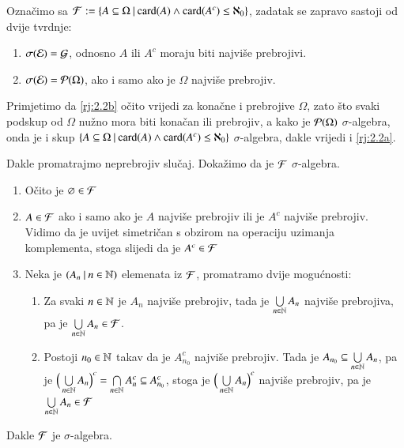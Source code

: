 \begin{rj}[\ref{zad:2.2}]
    Ozna\v cimo sa $\mathcal{F} := \{{A \subseteq \Omega} \: | \: {\textnormal{card}({A}) \land \textnormal{card}({A^c}) \leq \aleph_0}\}$,
    zadatak se zapravo sastoji od dvije tvrdnje:
    \begin{enumerate}[label=(\arabic*)]
        \item \label{rj:2.2a}
        $\sigma({\mathcal{E}}) = \mathcal{G}$, odnosno $A$ ili $A^c$ moraju biti najvi\v se prebrojivi.
        \item   \label{rj:2.2b}
        $\sigma({\mathcal{E}}) = \mathcal{P}({\Omega})$, ako i samo ako je $\Omega$ najvi\v se prebrojiv.
    \end{enumerate}
    Primjetimo da \ref{rj:2.2b} o\v cito vrijedi za kona\v cne i prebrojive $\Omega$, zato \v sto svaki podskup od $\Omega$ nu\v zno mora biti kona\v can ili prebrojiv, a kako je $\mathcal{P}({\Omega})$ $\sigma$-algebra, onda je i skup $\{{A \subseteq \Omega} \: | \: {\textnormal{card}({A}) \land \textnormal{card}({A^c}) \leq \aleph_0}\}$ $\sigma$-algebra, dakle vrijedi i \ref{rj:2.2a}.

    Dakle promatrajmo neprebrojiv slu\v caj.
    Doka\v zimo da je $\mathcal{F}$ $\sigma$-algebra.
    \begin{enumerate}[label=(\roman*)]
        \item O\v cito je $\varnothing \in \mathcal{F}$
        \item $A \in \mathcal{F}$ ako i samo ako je $A$ najvi\v se prebrojiv ili je $A^c$ najvi\v se prebrojiv.
        Vidimo da je uvijet simetri\v can s obzirom na operaciju uzimanja komplementa, stoga slijedi da je $A^c \in \mathcal{F}$
        \item Neka je $({A_n} \: | \: {n \in \mathbb{N}})$ elemenata iz $\mathcal{F}$, promatramo dvije mogu\' cnosti:
        \begin{enumerate}[label=\arabic*$\degree$)]
            \item Za svaki $n \in \mathbb{N}$ je $A_n$ najvi\v se prebrojiv, tada je $\bigcup\limits_{n \in \mathbb{N}}^{} A_n$ najvi\v se prebrojiva, pa je $\bigcup\limits_{n \in \mathbb{N}}^{} A_n \in \mathcal{F}$.
            \item Postoji $n_0 \in \mathbb{N}$ takav da je $A_{n_0}^c$ najvi\v se prebrojiv.
            Tada je $A_{n_0} \subseteq \bigcup\limits_{n \in \mathbb{N}}^{} A_n$, pa je $\Big( \bigcup\limits_{n \in \mathbb{N}}^{} A_n \Big)^c = \bigcap\limits_{n \in \mathbb{N}}^{} A_n^c \subseteq A_{n_0}^c$, stoga je $\Big( \bigcup\limits_{n \in \mathbb{N}}^{} A_n \Big)^c$ najvi\v se prebrojiv, pa je $\bigcup\limits_{n \in \mathbb{N}}^{} A_n \in \mathcal{F}$
        \end{enumerate}
    \end{enumerate}
    Dakle $\mathcal{F}$ je $\sigma$-algebra.


\end{rj}

